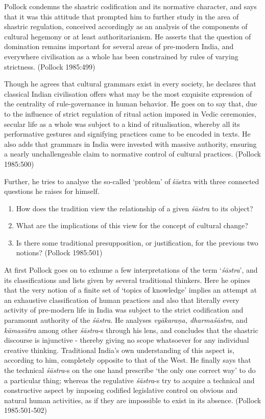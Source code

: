 Pollock condemns the shastric codification and its normative character, and says that it was this attitude that prompted him to further study in the area of shastric regulation, conceived accordingly as an analysis of the components of cultural hegemony or at least authoritarianism. He asserts that the question of domination remains important for several areas of pre-modern India, and everywhere civilisation as a whole has been constrained by rules of varying strictness. (Pollock 1985:499)

Though he agrees that cultural grammars exist in every society, he declares that classical Indian civilisation offers what may be the most exquisite expression of the centrality of rule-governance in human behavior. He goes on to say that, due to the influence of strict regulation of ritual action imposed in Vedic ceremonies, secular life as a whole was subject to a kind of ritualisation, whereby all its performative gestures and signifying practices came to be encoded in texts. He also adds that grammars in India were invested with massive authority, ensuring a nearly unchallengeable claim to normative control of cultural practices. (Pollock 1985:500)

Further, he tries to analyse the so-called `problem' of śāstra with three connected questions he raises for himself.
\begin{enumerate}
\item How does the tradition view the relationship of a given {\sl śāstra} to its object?

\newpage

\item What are the implications of this view for the concept of cultural change?

\item Is there some traditional presupposition, or justification, for the previous two notions? (Pollock 1985:501)
\end{enumerate}

At first Pollock goes on to exhume a few interpretations of the term `{\sl śāstra}', and its classifications and lists given by several traditional thinkers. Here he opines that the very notion of a finite set of `topics of knowledge' implies an attempt at an exhaustive classification of human practices and also that literally every activity of pre-modern life in India was subject to the strict codification and paramount authority of the {\sl śāstra}. He analyses {\sl vyākaraṇa, dharmaśāstra}, and {\sl kāmasūtra} among other {\sl śāstra}-s through his lens, and concludes that the shastric discourse is injunctive - thereby giving no scope whatsoever for any individual creative thinking. Traditional India's own understanding of this aspect is, according to him, completely opposite to that of the West. He finally says that the technical {\sl śāstra}-s on the one hand prescribe `the only one correct way' to do a particular thing;  whereas the regulative {\sl śāstra}-s try to acquire a technical and constructive aspect by imposing codified legislative control on obvious and natural human activities, as if they are impossible to exist in its absence. (Pollock 1985:501-502)

